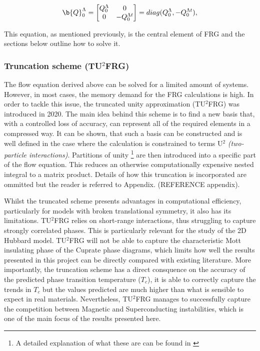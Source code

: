 \documentclass[12pt]{article}
\begin{document}
\begin{equation}\label{Q0 term }
\b{Q}_0^{\Lambda} =
\begin{bmatrix}
Q_0^{\Lambda} & 0 \\
0 & -Q_0^{\Lambda t}
\end{bmatrix}
= diag(Q_0^{\Lambda}, - Q_0^{\Lambda t}),
\end{equation}

\noindent This equation, as mentioned previously, is the central element of FRG and the sections below outline how to solve it.


\subsubsection{Truncation scheme (TU$^2$FRG)}
\label{subsubsec:Truncation scheme}

The flow equation derived above can be solved for a limited amount of systems. However, in most cases, the memory demand for the 
FRG calculations is high.  In order to tackle this issue, the truncated unity approximation (TU$^2$FRG) was introduced in 2020\cite{eckhardt2020truncated}. 
The main idea behind this scheme is to find a new basis that, with a controlled loss of accuracy, can represent all 
of the required elements in a compressed way. It can be shown\cite{lichtenstein2018functional}, that such a basis can be constructed and is 
well defined in the case where the calculation is constrained to terms U$^{2}$ \textit{(two-particle interactions)}.
Partitions of unity \footnote{A detailed explanation of what these are can be found in \cite{lichtenstein2018functional}} are then introduced into a specific part of the flow equation. This reduces an otherwise computationally expensive nested integral to a matrix product. 
Details of how this truncation is incorporated are ommitted but the reader is referred to Appendix. (REFERENCE appendix).\par
\medskip

\noindent Whilst the truncated scheme presents advantages in computational efficiency, particularly for models with broken translational symmetry, it also has its limitations. 
TU$^2$FRG relies on short-range interactions, thus struggling to capture strongly correlated phases. 
This is particularly relevant for the study of the 2D Hubbard model. TU$^2$FRG will not be able to capture
the characteristic Mott insulating phase of the Cuprate phase diagrams\cite{imada1998metal}, which limits how well the results presented in this project can be directly compared with existing literature. 
More importantly, the truncation scheme has a direct consquence on the accuracy of the predicted phase transition temperature ($T_c$), it is able to correctly capture
the trends in $T_c$ but the values predicted are much higher than what is sensible to expect in real materials.
Nevertheless, TU$^2$FRG manages to successfully capture the competition between Magnetic and Superconducting instabilities, which is one of the main focus of the results presented here. 
\end{document}
